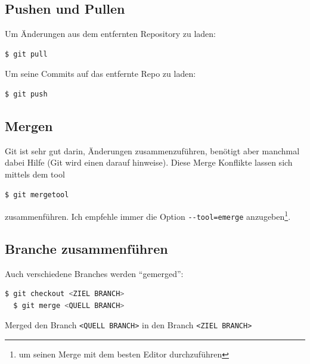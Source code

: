 \documentclass[landscape,a4paper]{cheatsheet}
\newcommand{\highlight}[1]{{\textsf{\color{primaryColor}#1}}}
\begin{document}
\subsection{\highlight{Pushen} und \highlight{Pullen}}
Um Änderungen aus dem entfernten Repository zu laden:
\begin{lstlisting}[language=bash]
  $ git pull
\end{lstlisting} %

Um seine Commits auf das entfernte Repo zu laden:
\begin{lstlisting}[language=bash]
  $ git push
\end{lstlisting} %

\subsection{\highlight{Mergen}}
Git ist sehr gut darin, Änderungen zusammenzuführen, benötigt aber
manchmal dabei Hilfe (Git wird einen darauf hinweise). Diese
\highlight{Merge Konflikte} lassen sich mittels dem tool
\begin{lstlisting}[language=bash]
  $ git mergetool
\end{lstlisting} %
zusammenführen. Ich empfehle immer die Option
\lstinline{--tool=emerge} anzugeben\footnote{um seinen Merge mit dem
  besten Editor durchzuführen}.

\subsection{Branche zusammenführen}
Auch verschiedene Branches werden \enquote{gemerged}:
\begin{lstlisting}[language=bash]
  $ git checkout <ZIEL BRANCH>
  $ git merge <QUELL BRANCH>
\end{lstlisting} %
Merged den Branch \lstinline{<QUELL BRANCH>} in den Branch
\lstinline{<ZIEL BRANCH>}
\end{document}
